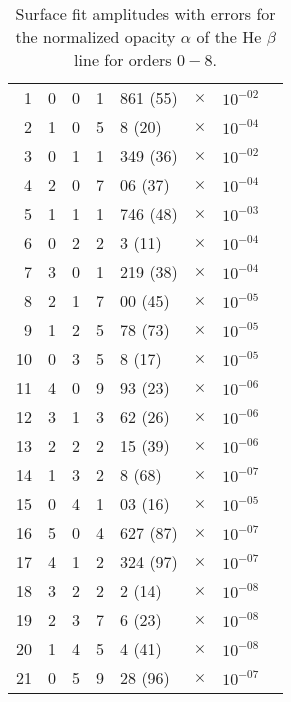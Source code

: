 
\begin{table}[htbp]
\caption{Surface fit amplitudes with errors for the normalized opacity $\alpha$ of the He $\beta$ line for orders $0-8$.}
\begin{center}
\begin{tabular}{rrrr@{.}lccl}
%
1 & 0 & 0 & 1 & 861 (55) & $ \times $ & $ 10^{-02} $ \\[5pt]
2 & 1 & 0 & 5 & 8 (20) & $ \times $ & $ 10^{-04} $ \\
3 & 0 & 1 & 1 & 349 (36) & $ \times $ & $ 10^{-02} $ \\[5pt]
4 & 2 & 0 & 7 & 06 (37) & $ \times $ & $ 10^{-04} $ \\
5 & 1 & 1 & 1 & 746 (48) & $ \times $ & $ 10^{-03} $ \\
6 & 0 & 2 & 2 & 3 (11) & $ \times $ & $ 10^{-04} $ \\[5pt]
7 & 3 & 0 & 1 & 219 (38) & $ \times $ & $ 10^{-04} $ \\
8 & 2 & 1 & 7 & 00 (45) & $ \times $ & $ 10^{-05} $ \\
9 & 1 & 2 & 5 & 78 (73) & $ \times $ & $ 10^{-05} $ \\
10 & 0 & 3 & 5 & 8 (17) & $ \times $ & $ 10^{-05} $ \\[5pt]
11 & 4 & 0 & 9 & 93 (23) & $ \times $ & $ 10^{-06} $ \\
12 & 3 & 1 & 3 & 62 (26) & $ \times $ & $ 10^{-06} $ \\
13 & 2 & 2 & 2 & 15 (39) & $ \times $ & $ 10^{-06} $ \\
14 & 1 & 3 & 2 & 8 (68) & $ \times $ & $ 10^{-07} $ \\
15 & 0 & 4 & 1 & 03 (16) & $ \times $ & $ 10^{-05} $ \\[5pt]
16 & 5 & 0 & 4 & 627 (87) & $ \times $ & $ 10^{-07} $ \\
17 & 4 & 1 & 2 & 324 (97) & $ \times $ & $ 10^{-07} $ \\
18 & 3 & 2 & 2 & 2 (14) & $ \times $ & $ 10^{-08} $ \\
19 & 2 & 3 & 7 & 6 (23) & $ \times $ & $ 10^{-08} $ \\
20 & 1 & 4 & 5 & 4 (41) & $ \times $ & $ 10^{-08} $ \\
21 & 0 & 5 & 9 & 28 (96) & $ \times $ & $ 10^{-07} $ \\[5pt]

\end{tabular}
\end{center}
\end{table}
